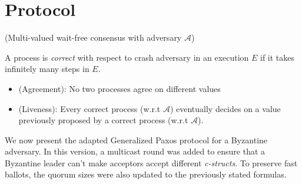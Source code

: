 \section{Protocol}
%
\begin{definition}
(Multi-valued wait-free consensus with adversary $\mathcal{A}$)

A process is \emph{correct} with respect to crash adversary 
in an execution $E$ if it takes infinitely many steps in $E$.
%
\begin{itemize}
\item (Agreement): No two processes agree on different values  
\item (Liveness): Every correct process (w.r.t $\mathcal{A}$) 
eventually decides on a value previously proposed by a correct process (w.r.t $\mathcal{A}$).
\end{itemize}
%
\end{definition}
%

%
\newpage
We now present the adapted Generalized Paxos protocol for a Byzantine adversary. In this version, a multicast round was added to ensure that a Byzantine leader can't make acceptors accept different \textit{c-structs}. To preserve fast ballots, the quorum sizes were also updated to the previously stated formulas.

